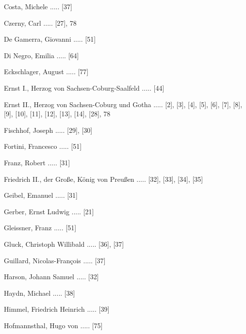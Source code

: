 \documentclass[a4paper, twocolumn, 11pt]{book}
\begin{document}
\newline 
Costa, Michele ..... [37]

\newline 
Czerny, Carl ..... [27], 78

\newline 
De Gamerra, Giovanni ..... [51]

\newline 
Di Negro, Emilia ..... [64]

\newline 
Eckschlager, August ..... [77]

\newline 
Ernst I., Herzog von Sachsen-Coburg-Saalfeld ..... [44]

\newline 
Ernst II., Herzog von Sachsen-Coburg und Gotha ..... [2], [3], [4], [5], [6], [7], [8], [9], [10], [11], [12], [13], [14], [28], 78

\newline 
Fischhof, Joseph ..... [29], [30]

\newline 
Fortini, Francesco ..... [51]

\newline 
Franz, Robert ..... [31]

\newline 
Friedrich II., der Große, König von Preußen ..... [32], [33], [34], [35]

\newline 
Geibel, Emanuel ..... [31]

\newline 
Gerber, Ernst Ludwig ..... [21]

\newline 
Gleissner, Franz ..... [51]

\newline 
Gluck, Christoph Willibald ..... [36], [37]

\newline 
Guillard, Nicolas-François ..... [37]

\newline 
Harson, Johann Samuel ..... [32]

\newline 
Haydn, Michael ..... [38]

\newline 
Himmel, Friedrich Heinrich ..... [39]

\newline 
Hofmannsthal, Hugo von ..... [75]
\end{document}
